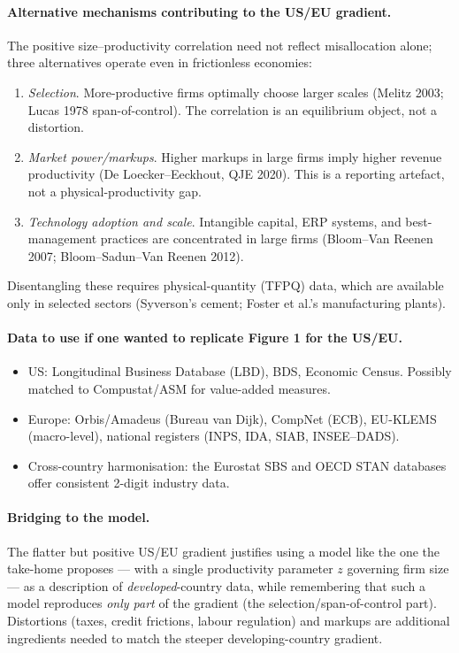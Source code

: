 \documentclass[11pt,a4paper]{article}
\begin{document}
\paragraph{Alternative mechanisms contributing to the US/EU gradient.}
The positive size--productivity correlation need not reflect misallocation alone; three alternatives operate even in frictionless economies:
\begin{enumerate}[leftmargin=*,itemsep=1pt]
    \item \emph{Selection}. More-productive firms optimally choose larger scales (Melitz 2003; Lucas 1978 span-of-control). The correlation is an equilibrium object, not a distortion.
    \item \emph{Market power/markups}. Higher markups in large firms imply higher revenue productivity (De Loecker--Eeckhout, QJE 2020). This is a reporting artefact, not a physical-productivity gap.
    \item \emph{Technology adoption and scale}. Intangible capital, ERP systems, and best-management practices are concentrated in large firms (Bloom--Van Reenen 2007; Bloom--Sadun--Van Reenen 2012).
\end{enumerate}
Disentangling these requires physical-quantity (TFPQ) data, which are available only in selected sectors (Syverson's cement; Foster et al.'s manufacturing plants).

\paragraph{Data to use if one wanted to replicate Figure 1 for the US/EU.}
\begin{itemize}[leftmargin=*,itemsep=1pt]
    \item US: Longitudinal Business Database (LBD), BDS, Economic Census. Possibly matched to Compustat/ASM for value-added measures.
    \item Europe: Orbis/Amadeus (Bureau van Dijk), CompNet (ECB), EU-KLEMS (macro-level), national registers (INPS, IDA, SIAB, INSEE--DADS).
    \item Cross-country harmonisation: the Eurostat SBS and OECD STAN databases offer consistent 2-digit industry data.
\end{itemize}

\paragraph{Bridging to the model.}
The flatter but positive US/EU gradient justifies using a model like the one the take-home proposes --- with a single productivity parameter $z$ governing firm size --- as a description of \emph{developed}-country data, while remembering that such a model reproduces \emph{only part} of the gradient (the selection/span-of-control part). Distortions (taxes, credit frictions, labour regulation) and markups are additional ingredients needed to match the steeper developing-country gradient.
\end{document}
